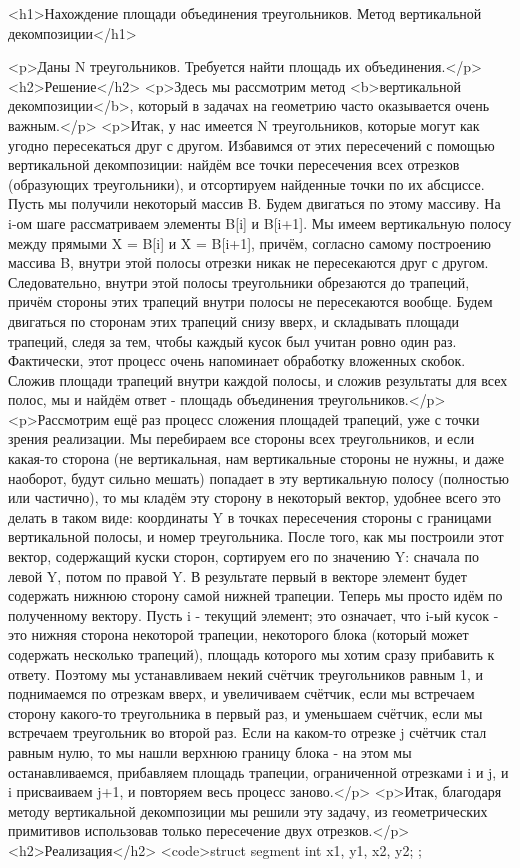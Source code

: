 <h1>Нахождение площади объединения треугольников. Метод вертикальной декомпозиции</h1>

<p>Даны N треугольников. Требуется найти площадь их объединения.</p>
<h2>Решение</h2>
<p>Здесь мы рассмотрим метод <b>вертикальной декомпозиции</b>, который в задачах на геометрию часто оказывается очень важным.</p>
<p>Итак, у нас имеется N треугольников, которые могут как угодно пересекаться друг с другом. Избавимся от этих пересечений с помощью вертикальной декомпозиции: найдём все точки пересечения всех отрезков (образующих треугольники), и отсортируем найденные точки по их абсциссе. Пусть мы получили некоторый массив B. Будем двигаться по этому массиву. На i-ом шаге рассматриваем элементы B[i] и B[i+1]. Мы имеем вертикальную полосу между прямыми X = B[i] и X = B[i+1], причём, согласно самому построению массива B, внутри этой полосы отрезки никак не пересекаются друг с другом. Следовательно, внутри этой полосы треугольники обрезаются до трапеций, причём стороны этих трапеций внутри полосы не пересекаются вообще. Будем двигаться по сторонам этих трапеций снизу вверх, и складывать площади трапеций, следя за тем, чтобы каждый кусок был учитан ровно один раз. Фактически, этот процесс очень напоминает обработку вложенных скобок. Сложив площади трапеций внутри каждой полосы, и сложив результаты для всех полос, мы и найдём ответ - площадь объединения треугольников.</p>
<p>Рассмотрим ещё раз процесс сложения площадей трапеций, уже с точки зрения реализации. Мы перебираем все стороны всех треугольников, и если какая-то сторона (не вертикальная, нам вертикальные стороны не нужны, и даже наоборот, будут сильно мешать) попадает в эту вертикальную полосу (полностью или частично), то мы кладём эту сторону в некоторый вектор, удобнее всего это делать в таком виде: координаты Y в точках пересечения стороны с границами вертикальной полосы, и номер треугольника. После того, как мы построили этот вектор, содержащий куски сторон, сортируем его по значению Y: сначала по левой Y, потом по правой Y. В результате первый в векторе элемент будет содержать нижнюю сторону самой нижней трапеции. Теперь мы просто идём по полученному вектору. Пусть i - текущий элемент; это означает, что i-ый кусок - это нижняя сторона некоторой трапеции, некоторого блока (который может содержать несколько трапеций), площадь которого мы хотим сразу прибавить к ответу. Поэтому мы устанавливаем некий счётчик треугольников равным 1, и поднимаемся по отрезкам вверх, и увеличиваем счётчик, если мы встречаем сторону какого-то треугольника в первый раз, и уменьшаем счётчик, если мы встречаем треугольник во второй раз. Если на каком-то отрезке j счётчик стал равным нулю, то мы нашли верхнюю границу блока - на этом мы останавливаемся, прибавляем площадь трапеции, ограниченной отрезками i и j, и i присваиваем j+1, и повторяем весь процесс заново.</p>
<p>Итак, благодаря методу вертикальной декомпозиции мы решили эту задачу, из геометрических примитивов использовав только пересечение двух отрезков.</p>
<h2>Реализация</h2>
<code>struct segment {
	int x1, y1, x2, y2;
};

